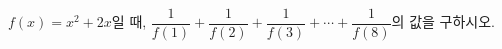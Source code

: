 \hspace*{2mm}\begin{minipage}[t]{\dimexpr\linewidth-2mm\relax}\vspace{0pt}
$f(x)=x^2+2x$일 때, $\dfrac{1}{f(1)}+\dfrac{1}{f(2)}+\dfrac{1}{f(3)}+\cdots+\dfrac{1}{f(8)}$의 값을 구하시오.\end{minipage}
